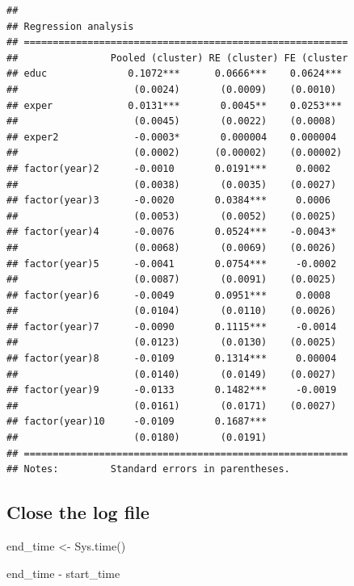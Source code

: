 \documentclass[
]{article}
\newenvironment{Shaded}{\begin{snugshade}}{\end{snugshade}}
\newcommand{\FunctionTok}[1]{\textcolor[rgb]{0.00,0.00,0.00}{#1}}
\newcommand{\NormalTok}[1]{#1}
\newcommand{\OtherTok}[1]{\textcolor[rgb]{0.56,0.35,0.01}{#1}}
\newcommand{\SpecialCharTok}[1]{\textcolor[rgb]{0.00,0.00,0.00}{#1}}
\begin{document}
\begin{verbatim}
## 
## Regression analysis
## ========================================================
##                Pooled (cluster) RE (cluster) FE (cluster
## educ              0.1072***      0.0666***    0.0624*** 
##                    (0.0024)       (0.0009)    (0.0010)  
## exper             0.0131***       0.0045**    0.0253*** 
##                    (0.0045)       (0.0022)    (0.0008)  
## exper2             -0.0003*       0.000004    0.000004  
##                    (0.0002)      (0.00002)    (0.00002) 
## factor(year)2      -0.0010       0.0191***     0.0002   
##                    (0.0038)       (0.0035)    (0.0027)  
## factor(year)3      -0.0020       0.0384***     0.0006   
##                    (0.0053)       (0.0052)    (0.0025)  
## factor(year)4      -0.0076       0.0524***    -0.0043*  
##                    (0.0068)       (0.0069)    (0.0026)  
## factor(year)5      -0.0041       0.0754***     -0.0002  
##                    (0.0087)       (0.0091)    (0.0025)  
## factor(year)6      -0.0049       0.0951***     0.0008   
##                    (0.0104)       (0.0110)    (0.0026)  
## factor(year)7      -0.0090       0.1115***     -0.0014  
##                    (0.0123)       (0.0130)    (0.0025)  
## factor(year)8      -0.0109       0.1314***     0.00004  
##                    (0.0140)       (0.0149)    (0.0027)  
## factor(year)9      -0.0133       0.1482***     -0.0019  
##                    (0.0161)       (0.0171)    (0.0027)  
## factor(year)10     -0.0109       0.1687***              
##                    (0.0180)       (0.0191)              
## ========================================================
## Notes:         Standard errors in parentheses.
\end{verbatim}

\hypertarget{close-the-log-file}{%
\subsection{Close the log file}\label{close-the-log-file}}

\begin{Shaded}
\begin{Highlighting}[]
\NormalTok{end\_time }\OtherTok{\textless{}{-}} \FunctionTok{Sys.time}\NormalTok{()}

\NormalTok{end\_time }\SpecialCharTok{{-}}\NormalTok{ start\_time}
\end{Highlighting}
\end{Shaded}
\end{document}
